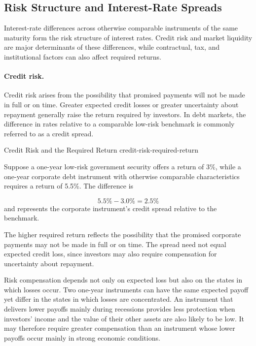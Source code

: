 \subsection{Risk Structure and Interest-Rate Spreads}

Interest-rate differences across otherwise comparable instruments of the same maturity form the risk structure of interest rates. Credit risk and market liquidity are major determinants of these differences, while contractual, tax, and institutional factors can also affect required returns.

\paragraph{Credit risk.}

Credit risk arises from the possibility that promised payments will not be made in full or on time. Greater expected credit losses or greater uncertainty about repayment generally raise the return required by investors. In debt markets, the difference in rates relative to a comparable low-risk benchmark is commonly referred to as a credit spread.

\begin{example}{Credit Risk and the Required Return} {credit-risk-required-return}

Suppose a one-year low-risk government security offers a return of 3\%, while a one-year corporate debt instrument with otherwise comparable characteristics requires a return of 5.5\%. The difference is

\[
5.5\%-3.0\%=2.5\%
\]
and represents the corporate instrument's credit spread relative to the benchmark.

The higher required return reflects the possibility that the promised corporate payments may not be made in full or on time. The spread need not equal expected credit loss, since investors may also require compensation for uncertainty about repayment.

\end{example}

Risk compensation depends not only on expected loss but also on the states in which losses occur. Two one-year instruments can have the same expected payoff yet differ in the states in which losses are concentrated. An instrument that delivers lower payoffs mainly during recessions provides less protection when investors' income and the value of their other assets are also likely to be low. It may therefore require greater compensation than an instrument whose lower payoffs occur mainly in strong economic conditions.

